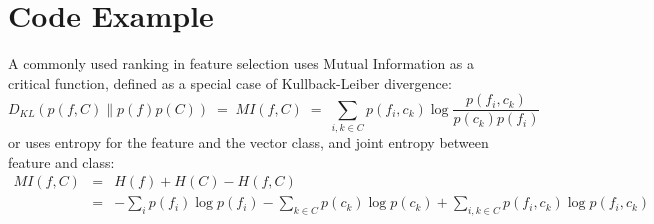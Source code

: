 \documentclass[a4paper,fleqn]{report}
\begin{document}








%


\section{Code Example} \label{sec:CodeExample}

A commonly used ranking in feature selection uses Mutual Information as a critical function, defined as 
a special case of Kullback-Leiber divergence: 
\begin{equation} \label{eq:kldiv}
D_{KL}(p(f,C) \| p(f)p(C))\;=\;MI(f,C)\;=\;\sum_{i,k\in C}p(f_i,c_k)\log \frac{p(f_i,c_k)}{p(c_k)p(f_i)}
\end{equation}
or uses entropy for the feature and the vector class, and joint entropy between feature and class: 
\begin{eqnarray} \label{eq:entropies}
MI(f,C) &=& H(f)+H(C)-H(f,C) \\
        &=& -\sum_{i} p(f_i) \log{p(f_i)} -\sum_{k\in C} p(c_k) \log{p(c_k)} + \sum_{i,k\in C} p(f_i,c_k) \log{p(f_i,c_k)} \nonumber
\end{eqnarray}
\end{document}
